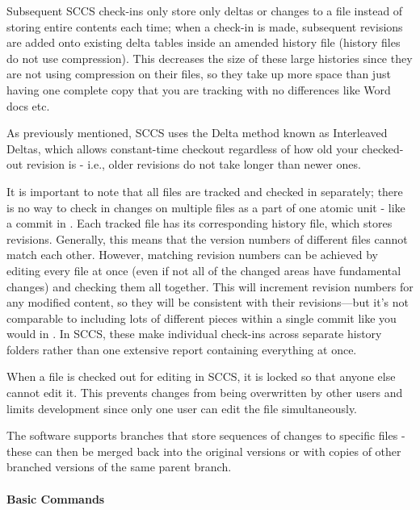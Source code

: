 Subsequent SCCS check-ins only store only deltas or changes to a file instead of storing entire contents each time; when a check-in is made, subsequent revisions are added onto existing delta tables inside an amended history file (history files do not use compression). This decreases the size of these large histories since they are not using compression on their files, so they take up more space than just having one complete copy that you are tracking with no differences like Word docs etc.
\smallskip

As previously mentioned, SCCS uses the Delta method known as Interleaved Deltas, which allows constant-time checkout regardless of how old your checked-out revision is - i.e., older revisions do not take longer than newer ones.
\smallskip

It is important to note that all files are tracked and checked in separately; there is no way to check in changes on multiple files as a part of one atomic unit - like a commit in . Each tracked file has its corresponding history file, which stores revisions. Generally, this means that the version numbers of different files cannot match each other. However, matching revision numbers can be achieved by editing every file at once (even if not all of the changed areas have fundamental changes) and checking them all together. This will increment revision numbers for any modified content, so they will be consistent with their revisions—but it's not comparable to including lots of different pieces within a single commit like you would in . In SCCS, these make individual check-ins across separate history folders rather than one extensive report containing everything at once.
\smallskip

When a file is checked out for editing in SCCS, it is locked so that anyone else cannot edit it. This prevents changes from being overwritten by other users and limits development since only one user can edit the file simultaneously.
\smallskip

The software supports branches that store sequences of changes to specific files - these can then be merged back into the original versions or with copies of other branched versions of the same parent branch.

\paragraph{Basic Commands}

